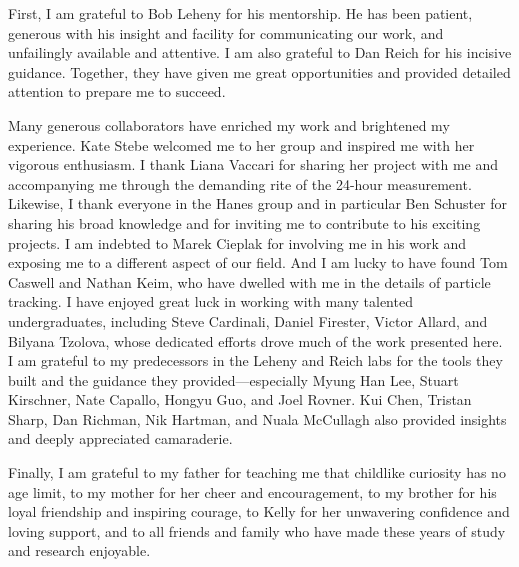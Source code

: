 \begin{frontmatter}
\begin{acknowledgment}

First, I am grateful to Bob Leheny for his mentorship. He has been patient, generous with his insight and facility for communicating our work, and unfailingly available and attentive. I am also grateful to Dan Reich for his incisive guidance. Together, they have given me great opportunities and provided detailed attention to prepare me to succeed.

Many generous collaborators have enriched my work and brightened my experience. Kate Stebe welcomed me to her group and inspired me with her vigorous enthusiasm. I thank Liana Vaccari for sharing her project with me and accompanying me through the demanding rite of the 24-hour measurement. Likewise, I thank everyone in the Hanes group and in particular Ben Schuster for sharing his broad knowledge and for inviting me to contribute to his exciting projects. I am indebted to Marek Cieplak for involving me in his work and exposing me to a different aspect of our field. And I am lucky to have found Tom Caswell and Nathan Keim, who have dwelled with me in the details of particle tracking. I have enjoyed great luck in working with many talented undergraduates, including Steve Cardinali, Daniel Firester, Victor Allard, and Bilyana Tzolova, whose dedicated efforts drove much of the work presented here. I am grateful to my predecessors in the Leheny and Reich labs for the tools they built and the guidance they provided---especially Myung Han Lee, Stuart Kirschner, Nate Capallo, Hongyu Guo, and Joel Rovner. Kui Chen, Tristan Sharp, Dan Richman, Nik Hartman, and Nuala McCullagh also provided insights and deeply appreciated camaraderie.

Finally, I am grateful to my father for teaching me that childlike curiosity has no age limit, to my mother for her cheer and encouragement, to my brother for his loyal friendship and inspiring courage, to Kelly for her unwavering confidence and loving support, and to all friends and family who have made these years of study and research enjoyable.

\end{acknowledgment}

\tableofcontents



\end{frontmatter}
